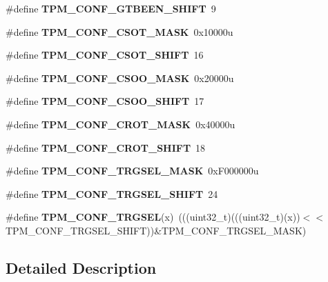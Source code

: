 \begin{DoxyCompactItemize}
\#define {\bfseries T\+P\+M\+\_\+\+C\+O\+N\+F\+\_\+\+G\+T\+B\+E\+E\+N\+\_\+\+S\+H\+I\+FT}~9
\item 
\mbox{\label{group___t_p_m___register___masks_gab1950d4b5e28ba67b305e3fca7f716f0}} 
\#define {\bfseries T\+P\+M\+\_\+\+C\+O\+N\+F\+\_\+\+C\+S\+O\+T\+\_\+\+M\+A\+SK}~0x10000u
\item 
\mbox{\label{group___t_p_m___register___masks_ga007e2eccc45940318d15822a729ca061}} 
\#define {\bfseries T\+P\+M\+\_\+\+C\+O\+N\+F\+\_\+\+C\+S\+O\+T\+\_\+\+S\+H\+I\+FT}~16
\item 
\mbox{\label{group___t_p_m___register___masks_ga627db017557d5466cd9aeb7e8e8f91ed}} 
\#define {\bfseries T\+P\+M\+\_\+\+C\+O\+N\+F\+\_\+\+C\+S\+O\+O\+\_\+\+M\+A\+SK}~0x20000u
\item 
\mbox{\label{group___t_p_m___register___masks_ga1c255c7ab3843cb488664bcc582a3294}} 
\#define {\bfseries T\+P\+M\+\_\+\+C\+O\+N\+F\+\_\+\+C\+S\+O\+O\+\_\+\+S\+H\+I\+FT}~17
\item 
\mbox{\label{group___t_p_m___register___masks_ga0ec6abbf10f7d46ff88e60b86e4c5de9}} 
\#define {\bfseries T\+P\+M\+\_\+\+C\+O\+N\+F\+\_\+\+C\+R\+O\+T\+\_\+\+M\+A\+SK}~0x40000u
\item 
\mbox{\label{group___t_p_m___register___masks_gaff3474ae6e7542a599c5696d928aab74}} 
\#define {\bfseries T\+P\+M\+\_\+\+C\+O\+N\+F\+\_\+\+C\+R\+O\+T\+\_\+\+S\+H\+I\+FT}~18
\item 
\mbox{\label{group___t_p_m___register___masks_gaf967b5f3b180314df5c4990c14b53ebe}} 
\#define {\bfseries T\+P\+M\+\_\+\+C\+O\+N\+F\+\_\+\+T\+R\+G\+S\+E\+L\+\_\+\+M\+A\+SK}~0x\+F000000u
\item 
\mbox{\label{group___t_p_m___register___masks_ga44218135f21b8af592c21f46fc097423}} 
\#define {\bfseries T\+P\+M\+\_\+\+C\+O\+N\+F\+\_\+\+T\+R\+G\+S\+E\+L\+\_\+\+S\+H\+I\+FT}~24
\item 
\mbox{\label{group___t_p_m___register___masks_ga9cce83bc335e7c53566df0a88083b045}} 
\#define {\bfseries T\+P\+M\+\_\+\+C\+O\+N\+F\+\_\+\+T\+R\+G\+S\+EL}(x)~(((uint32\+\_\+t)(((uint32\+\_\+t)(x))$<$$<$T\+P\+M\+\_\+\+C\+O\+N\+F\+\_\+\+T\+R\+G\+S\+E\+L\+\_\+\+S\+H\+I\+FT))\&T\+P\+M\+\_\+\+C\+O\+N\+F\+\_\+\+T\+R\+G\+S\+E\+L\+\_\+\+M\+A\+SK)
\end{DoxyCompactItemize}


\subsection{Detailed Description}
